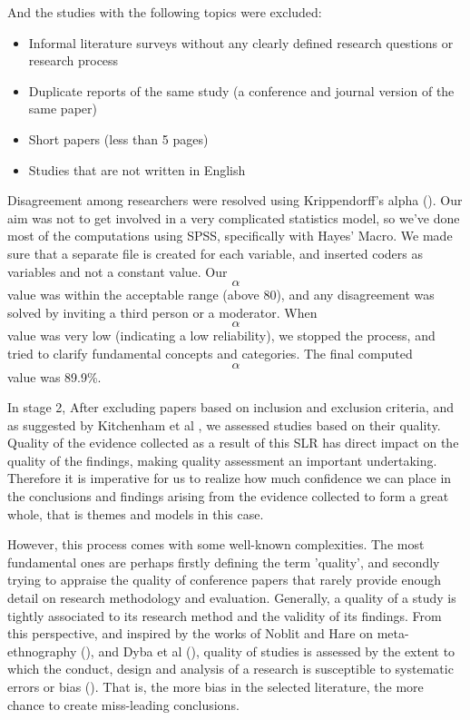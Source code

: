 \documentclass[review]{elsarticle}
\begin{document}
And the studies with the following topics were excluded: 

\begin{itemize}
    \item Informal literature surveys without any clearly defined research questions or research process
    \item Duplicate reports of the same study (a conference and journal version of the same paper)
    \item Short papers (less than 5 pages)
    \item Studies that are not written in English
\end{itemize}

Disagreement among researchers were resolved using Krippendorff’s alpha (\cite{krippendorff2011computing}). Our aim was not to get involved in a very complicated statistics model, so we've done most of the computations using SPSS, specifically with Hayes’ Macro. We made sure that a separate file is created for each variable, and inserted coders as variables and not a constant value. Our \begin{equation} \alpha \end{equation} value was within the acceptable range (above 80), and any disagreement was solved by inviting a third person or a moderator. When \begin{equation} \alpha \end{equation} value was very low (indicating a low reliability), we stopped the process, and tried to clarify fundamental concepts and categories. The final computed \begin{equation} \alpha \end{equation} value was 89.9\%. 

In stage 2, After excluding papers based on inclusion and exclusion criteria, and as suggested by Kitchenham et al \cite{kitchenham2015evidence}, we assessed studies based on their quality. Quality of the evidence collected as a result of this SLR has direct impact on the quality of the findings, making quality assessment an important undertaking. Therefore it is imperative for us to realize how much confidence we can place in the conclusions and findings arising from the evidence collected to form a great whole, that is themes and models in this case. 

However, this process comes with some well-known complexities. The most fundamental ones are perhaps firstly defining the term 'quality', and secondly trying to appraise the quality of conference papers that rarely provide enough detail on research methodology and evaluation. Generally, a quality of a study is tightly associated to its research method and the validity of its findings. From this perspective, and inspired by the works of Noblit and Hare on meta-ethnography (\cite{noblit1988meta}), and Dyba et al (\cite{dybaa2008empirical}), quality of studies is assessed by the extent to which the conduct, design and analysis of a research is susceptible to systematic errors or bias (\cite{cumpston2019updated}). That is, the more bias in the selected literature, the more chance to create miss-leading conclusions.
\end{document}
